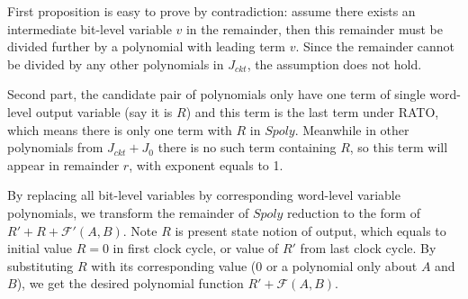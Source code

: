 \begin{Proof}
First proposition is easy to prove by contradiction: assume there exists an intermediate bit-level variable $v$ in the remainder,
then this remainder must be divided further by a polynomial with leading term $v$. 
Since the remainder cannot be divided by any other polynomials in $J_{ckt}$, the assumption does not hold.

Second part, the candidate pair of polynomials only have one term of
single word-level output variable (say it is $R$) and this term is the last term under RATO, which means there is only one term with
$R$ in $Spoly$. Meanwhile in other polynomials from $J_{ckt}+J_0$ there is no such term containing $R$, so this term 
will appear in remainder $r$, with exponent equals to 1.
\end{Proof}

By replacing all bit-level variables by corresponding word-level variable polynomials, we transform the remainder
of $Spoly$ reduction to the form of $R'+R+\mathcal F'(A,B)$. Note $R$ is present state notion of output, which
equals to initial value $R=0$ in first clock cycle, or value of $R'$ from last clock cycle. By substituting
$R$ with its corresponding value ($0$ or a polynomial only about $A$ and $B$), we get the desired polynomial function
$R'+\mathcal F(A,B)$.

